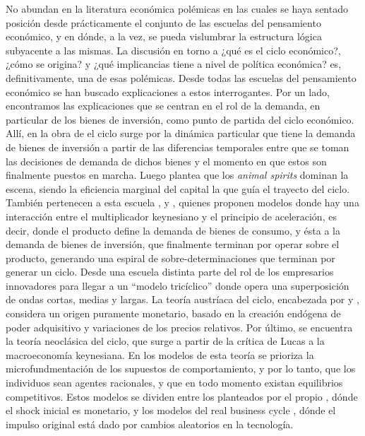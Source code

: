 \documentclass[a4paper]{article}
\begin{document}
No abundan en la literatura económica polémicas en las cuales se haya sentado posición desde prácticamente el conjunto de las escuelas del pensamiento económico, y en dónde, a la vez, se pueda vislumbrar la estructura lógica subyacente a las mismas. La discusión en torno a ¿qué es el ciclo económico?, ¿cómo se origina?  y ¿qué implicancias tiene a nivel de política económica? es, definitivamente, una de esas polémicas.
Desde todas las escuelas del pensamiento económico se han buscado explicaciones a estos interrogantes. Por un lado, encontramos las explicaciones que se centran en el rol de la demanda, en particular de los bienes de inversión, como punto de partida del ciclo económico. Allí, en la obra de \cite{kalecki2013essays} el ciclo surge por la dinámica particular que tiene la demanda de bienes de inversión a partir de las diferencias temporales entre que se toman las decisiones de demanda de dichos bienes y el momento en que estos son finalmente puestos en marcha. Luego \cite{keynes2018general} plantea que los \textit{animal spirits} dominan la escena, siendo la eficiencia marginal del capital la que guía el trayecto del ciclo. También pertenecen a esta escuela \cite{harrod1936trade}, \cite{kaldor1940model} y \cite{samuelson1939synthesis}, quienes proponen modelos donde hay una interacción entre el multiplicador keynesiano y el principio de aceleración, es decir, donde el producto define la demanda de bienes de consumo, y ésta a la demanda de bienes de inversión, que finalmente terminan por operar sobre el producto, generando una espiral de sobre-determinaciones que terminan por generar un ciclo. 
Desde una escuela distinta \cite{schumpeter1939business} parte del rol de los empresarios innovadores para llegar a un “modelo tricíclico” donde opera una superposición de ondas cortas, medias y largas. 
La teoría austríaca del ciclo, encabezada por \cite{hayek1933} y \cite{von1943elastic}, considera un origen puramente monetario, basado en la creación endógena de poder adquisitivo y variaciones de los precios relativos. 
Por último, se encuentra la teoría neoclásica del ciclo, que surge a partir de la crítica de Lucas a la macroeconomía keynesiana. En los modelos de esta teoría se prioriza la microfundmentación de los supuestos de comportamiento, y por lo tanto, que los individuos sean agentes racionales, y que en todo momento existan equilibrios competitivos. Estos modelos se dividen entre los planteados por el propio \cite{lucas1975equilibrium}, dónde el shock inicial es monetario, y los modelos del real business cycle \cite{plosser1989understanding}, dónde el impulso original está dado por cambios aleatorios en la tecnología.
\end{document}

